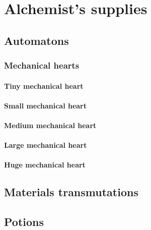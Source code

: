 \chapter{Alchemist's supplies}

\section{Automatons}

\subsection{Mechanical hearts}

\subsubsection{Tiny mechanical heart}

\subsubsection{Small mechanical heart}

\subsubsection{Medium mechanical heart}

\subsubsection{Large mechanical heart}

\subsubsection{Huge mechanical heart}

\section{Materials transmutations}

\section{Potions}